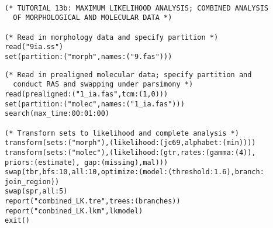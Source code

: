 \begin{verbatim}

(* TUTORIAL 13b: MAXIMUM LIKELIHOOD ANALYSIS; COMBINED ANALYSIS 
  OF MORPHOLOGICAL AND MOLECULAR DATA *)

(* Read in morphology data and specify partition *)
read("9ia.ss")
set(partition:("morph",names:("9.fas")))
\end{verbatim}
\begin{verbatim}
(* Read in prealigned molecular data; specify partition and 
  conduct RAS and swapping under parsimony *)
read(prealigned:("1_ia.fas",tcm:(1,0)))
set(partition:("molec",names:("1_ia.fas")))
search(max_time:00:01:00)

(* Transform sets to likelihood and complete analysis *)
transform(sets:("morph"),(likelihood:(jc69,alphabet:(min)))) 
transform(sets:("molec"),(likelihood:(gtr,rates:(gamma:(4)),
priors:(estimate), gap:(missing),mal)))
swap(tbr,bfs:10,all:10,optimize:(model:(threshold:1.6),branch:
join_region))
swap(spr,all:5)
report("combined_LK.tre",trees:(branches))
report("conbined_LK.lkm",lkmodel)
exit()
\end{verbatim}

